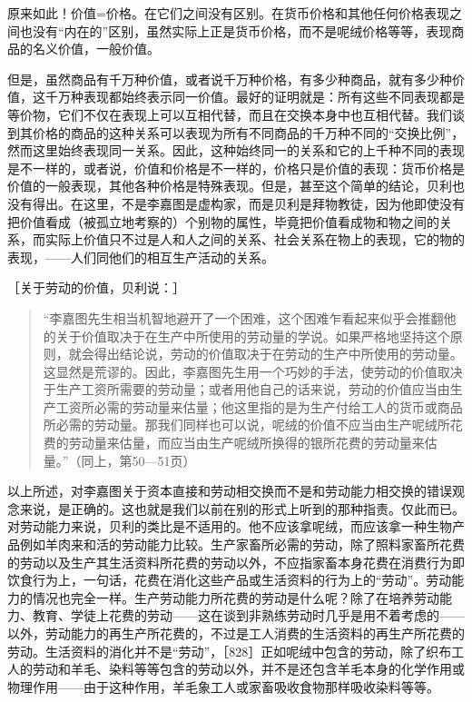 原来如此！价值=价格。在它们之间没有区别。在货币价格和其他任何价格表现之间也没有“内在的”区别，虽然实际上正是货币价格，而不是呢绒价格等等，表现商品的名义价值，一般价值。

但是，虽然商品有千万种价值，或者说千万种价格，有多少种商品，就有多少种价值，这千万种表现都始终表示同一价值。最好的证明就是：所有这些不同表现都是等价物，它们不仅在表现上可以互相代替，而且在交换本身中也互相代替。我们谈到其价格的商品的这种关系可以表现为所有不同商品的千万种不同的“交换比例”，然而这里始终表现同一关系。因此，这种始终同一的关系和它的上千种不同的表现是不一样的，或者说，价值和价格是不一样的，价格只是价值的表现：货币价格是价值的一般表现，其他各种价格是特殊表现。但是，甚至这个简单的结论，贝利也没有得出。在这里，不是李嘉图是虚构家，而是贝利是拜物教徒，因为他即使没有把价值看成（被孤立地考察的）个别物的属性，毕竟把价值看成物和物之间的关系，而实际上价值只不过是人和人之间的关系、社会关系在物上的表现，它的物的表现，——人们同他们的相互生产活动的关系。


［关于劳动的价值，贝利说：］

\begin{quote}{“李嘉图先生相当机智地避开了一个困难，这个困难乍看起来似乎会推翻他的关于价值取决于在生产中所使用的劳动量的学说。如果严格地坚持这个原则，就会得出结论说，劳动的价值取决于在劳动的生产中所使用的劳动量。这显然是荒谬的。因此，李嘉图先生用一个巧妙的手法，使劳动的价值取决于生产工资所需要的劳动量；或者用他自己的话来说，劳动的价值应当由生产工资所必需的劳动量来估量；他这里指的是为生产付给工人的货币或商品所必需的劳动量。那我们同样也可以说，呢绒的价值不应当由生产呢绒所花费的劳动量来估量，而应当由生产呢绒所换得的银所花费的劳动量来估量。”（同上，第50—51页）}\end{quote}

以上所述，对李嘉图关于资本直接和劳动相交换而不是和劳动能力相交换的错误观念来说，是正确的。这也就是我们以前在别的形式上听到的那种指责。仅此而已。对劳动能力来说，贝利的类比是不适用的。他不应该拿呢绒，而应该拿一种生物产品例如羊肉来和活的劳动能力比较。生产家畜所必需的劳动，除了照料家畜所花费的劳动以及生产其生活资料所花费的劳动以外，不应指家畜本身花费在消费行为即饮食行为上，一句话，花费在消化这些产品或生活资料的行为上的“劳动”。劳动能力的情况也完全一样。生产劳动能力所花费的劳动是什么呢？除了在培养劳动能力、教育、学徒上花费的劳动——这在谈到非熟练劳动时几乎是用不着考虑的——以外，劳动能力的再生产所花费的，不过是工人消费的生活资料的再生产所花费的劳动。生活资料的消化并不是“劳动”，［828］正如呢绒中包含的劳动，除了织布工人的劳动和羊毛、染料等等包含的劳动以外，并不是还包含羊毛本身的化学作用或物理作用——由于这种作用，羊毛象工人或家畜吸收食物那样吸收染料等等。

